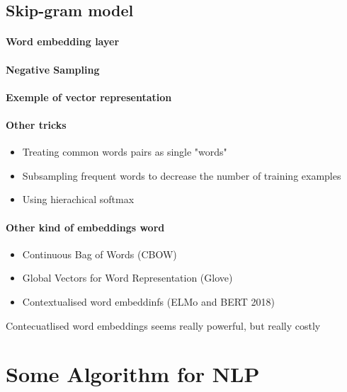 		\subsection*{Skip-gram model}

			\paragraph{Word embedding layer}

			\paragraph*{Negative Sampling}

			\paragraph*{Exemple of vector representation}
		
			\paragraph*{Other tricks}
				\begin{itemize}
					\item Treating common words pairs as single "words"
					\item Subsampling frequent words to decrease the number of training examples
					\item Using hierachical softmax
				\end{itemize}

			\paragraph*{Other kind of embeddings word}
				\begin{itemize}
					\item Continuous Bag of Words (CBOW)
					\item Global Vectors for Word Representation (Glove)
					\item Contextualised word embeddinfs (ELMo and BERT 2018)
				\end{itemize}

			Contecuatlised word embeddings seems really powerful, but really costly


	\section{Some Algorithm for NLP}

